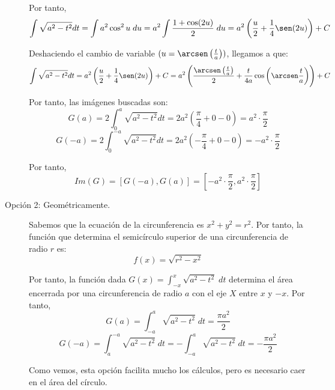 \begin{ejercicio}
\begin{description}
        Por tanto, 
        \begin{equation*}
            \int \sqrt{a^2-t^2}dt = \int a^2\cos^2 u\;du = a^2\int \frac{1+\cos(2u)}{2}\;du = a^2 \left(\frac{u}{2} + \frac{1}{4}\sen(2u)\right) +C
        \end{equation*}
    
        Deshaciendo el cambio de variable $(u=\arcsen\left(\frac{t}{a}\right))$, llegamos a que:
        \begin{equation*}
            \int \sqrt{a^2-t^2}dt = a^2 \left(\frac{u}{2} + \frac{1}{4}\sen(2u)\right) +C = a^2 \left(\frac{\arcsen\left(\frac{t}{a}\right)}{2} + \frac{t}{4a} \cos\left(\arcsen\frac{t}{a}\right)\right) +C
        \end{equation*}
    
        Por tanto, las imágenes buscadas son:
        \begin{equation*}
            G(a) = 2\int_0^a \sqrt{a^2-t^2}dt = 2a^2\left(\frac{\pi}{4}+0-0\right) = a^2\cdot \frac{\pi}{2}
        \end{equation*}
        \begin{equation*}
            G(-a) = 2\int_0^{-a} \sqrt{a^2-t^2}dt = 2a^2\left(-\frac{\pi}{4}+0-0\right) = -a^2\cdot \frac{\pi}{2}
        \end{equation*}
    
        Por tanto, \begin{equation*}
            Im(G)=[G(-a), G(a)] = \left[-a^2\cdot \frac{\pi}{2}, a^2\cdot \frac{\pi}{2}\right]
        \end{equation*}

        \item [Opción 2: Geométricamente.] Sabemos que la ecuación de la circunferencia es $x^2+y^2=r^2$. Por tanto, la función que determina el semicírculo superior de una circunferencia de radio $r$ es:
        \begin{equation*}
            f(x)=\sqrt{r^2-x^2}
        \end{equation*}

        Por tanto, la función dada $G(x)=\int_{-x}^x\sqrt{a^2-t^2}\;dt$ determina el área encerrada por una circunferencia de radio $a$ con el eje $X$ entre $x$ y $-x$. Por tanto,
        \begin{equation*}
            G(a) = \int_{-a}^a\sqrt{a^2-t^2}\;dt = \frac{\pi a^2}{2}
        \end{equation*}
        \begin{equation*}
            G(-a) = \int_{a}^{-a}\sqrt{a^2-t^2}\;dt= -\int_{-a}^a\sqrt{a^2-t^2}\;dt = -\frac{\pi a^2}{2}
        \end{equation*}

        Como vemos, esta opción facilita mucho los cálculos, pero es necesario caer en el área del círculo.
    \end{description}

\end{ejercicio}

